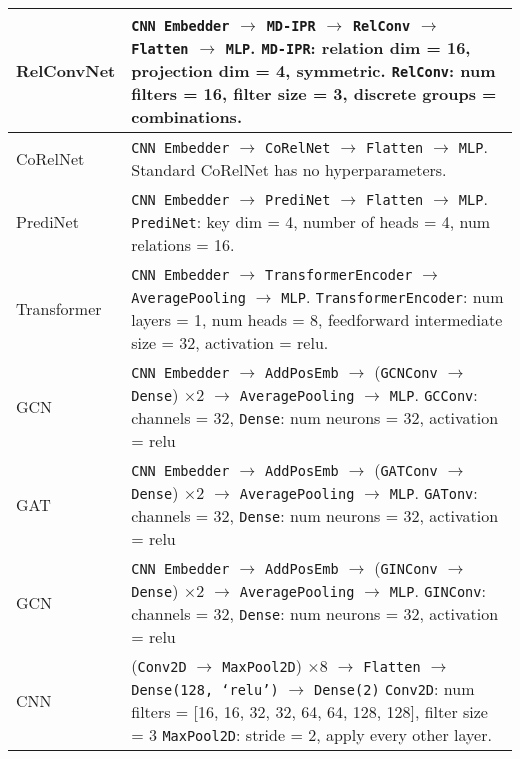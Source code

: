 \begin{tabular}{p{}p{}}
    RelConvNet        &
        \texttt{CNN Embedder} $\to$ \texttt{MD-IPR} $\to$ \texttt{RelConv} $\to$ \texttt{Flatten} $\to$ \texttt{MLP}. \newline
        \texttt{MD-IPR}: relation dim = 16, projection dim = 4, symmetric. \newline
        \texttt{RelConv}: num filters = 16, filter size = 3, discrete groups = combinations. \\\hline
    CoRelNet          &
        \texttt{CNN Embedder} $\to$ \texttt{CoRelNet} $\to$ \texttt{Flatten} $\to$ \texttt{MLP}. \newline
        Standard CoRelNet has no hyperparameters. \\\hline
    PrediNet          &
        \texttt{CNN Embedder} $\to$ \texttt{PrediNet} $\to$ \texttt{Flatten} $\to$ \texttt{MLP}. \newline
        \texttt{PrediNet}: key dim = 4, number of heads = 4, num relations = 16. \\\hline
    Transformer       &
        \texttt{CNN Embedder} $\to$ \texttt{TransformerEncoder} $\to$ \texttt{AveragePooling} $\to$ \texttt{MLP}. \newline
        \texttt{TransformerEncoder}: num layers = 1, num heads = 8, feedforward intermediate size = 32, activation = relu. \\\hline
    GCN               &
        \texttt{CNN Embedder} $\to$ \texttt{AddPosEmb} $\to$ (\texttt{GCNConv} $\to$ \texttt{Dense}) $\times 2$ $\to$ \texttt{AveragePooling} $\to$ \texttt{MLP}. \newline
        \texttt{GCConv}: channels = 32, \texttt{Dense}: num neurons = 32, activation = relu \\\hline
    GAT               &
        \texttt{CNN Embedder} $\to$ \texttt{AddPosEmb} $\to$ (\texttt{GATConv} $\to$ \texttt{Dense}) $\times 2$ $\to$ \texttt{AveragePooling} $\to$ \texttt{MLP}. \newline
        \texttt{GATonv}: channels = 32, \texttt{Dense}: num neurons = 32, activation = relu \\\hline
    GCN               &
        \texttt{CNN Embedder} $\to$ \texttt{AddPosEmb} $\to$ (\texttt{GINConv} $\to$ \texttt{Dense}) $\times 2$ $\to$ \texttt{AveragePooling} $\to$ \texttt{MLP}. \newline
        \texttt{GINConv}: channels = 32, \texttt{Dense}: num neurons = 32, activation = relu \\\hline
    CNN               &
    (\texttt{Conv2D} $\to$ \texttt{MaxPool2D}) $\times 8$ $\to$ \texttt{Flatten} $\to$ \texttt{Dense(128, `relu')} $\to$ \texttt{Dense(2)} \newline
    \texttt{Conv2D}: num filters = [16, 16, 32, 32, 64, 64, 128, 128], filter size = $3$ \newline
    \texttt{MaxPool2D}: stride = 2, apply every other layer. \\ \bottomrule
\end{tabular}